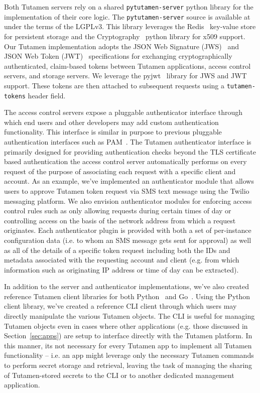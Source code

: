 Both Tutamen servers rely on a shared \texttt{pytutamen-server} python
library for the implementation of their core logic. The
\texttt{pytutamen-server} source is available
at~\cite{src-tutamen-pytutamenserver} under the terms of the
LGPLv3. This library leverages the Redis~\cite{redis} key-value store
for persistent storage and the Cryptography~\cite{python-cryptography}
python library for x509 support. Our Tutamen implementation adopts the
JSON Web Signature (JWS)~\cite{rfc7515} and JSON Web Token
(JWT)~\cite{rfc7519} specifications for exchanging cryptographically
authenticated, claim-based tokens between Tutamen applications, access
control servers, and storage servers. We leverage the
pyjwt~\cite{pyjwt} library for JWS and JWT support. These tokens are
then attached to subsequent requests using a \texttt{tutamen-tokens}
header field.

The access control servers expose a pluggable authenticator interface
through which end users and other developers may add custom
authentication functionality. This interface is similar in purpose to
previous pluggable authentication interfaces such as
PAM~\cite{samar1996}. The Tutamen authenticator interface is primarily
designed for providing authentication checks beyond the TLS
certificate based authentication the access control server
automatically performs on every request of the purpose of associating
each request with a specific client and account. As an example, we've
implemented an authenticator module that allows users to approve
Tutamen token request via SMS text message using the
Twilio~\cite{twilio} messaging platform. We also envision
authenticator modules for enforcing access control rules such as only
allowing requests during certain times of day or controlling access on
the basis of the network address from which a request originates. Each
authenticator plugin is provided with both a set of per-instance
configuration data (i.e. to whom an SMS message gets sent for
approval) as well as all of the details of a specific token request
including both the IDs and metadata associated with the requesting
account and client (e.g. from which information such as originating IP
address or time of day can be extracted).

In addition to the server and authenticator implementations, we've
also created reference Tutamen client libraries for both
Python~\cite{src-tutamen-pytutamen} and
Go~\cite{src-tutamen-go}. Using the Python client library, we've
created a reference CLI client through which users may directly
manipulate the various Tutamen objects. The CLI is useful for managing
Tutamen objects even in cases where other applications (e.g. those
discussed in Section~\ref{sec:apps}) are setup to interface directly
with the Tutamen platform. In this manner, its not necessary for every
Tutamen app to implement all Tutamen functionality -- i.e. an app
might leverage only the necessary Tutamen commands to perform secret
storage and retrieval, leaving the task of managing the sharing of
Tutamen-stored secrets to the CLI or to another dedicated management
application.

